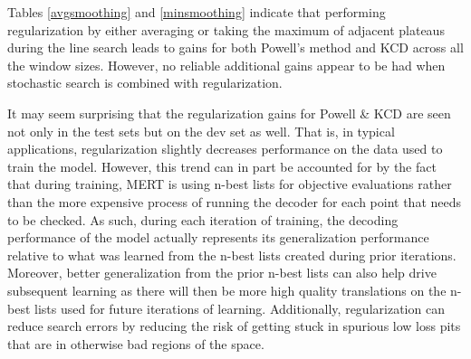 \documentclass[11pt]{article}
\begin{document}
Tables \ref{avgsmoothing} and \ref{minsmoothing} indicate that performing regularization by either averaging or taking the maximum of adjacent plateaus during the line search leads to gains for both Powell's method and KCD across all the window sizes. However, no reliable additional gains appear to be had when stochastic search is combined with regularization.

It may seem surprising that the regularization gains for Powell \& KCD are seen not only in the test sets but on the dev set as well. That is, in typical applications, regularization slightly decreases performance on the data used to train the model. However, this trend can in part be accounted for by the fact that during training, MERT is using n-best lists for objective evaluations rather than the more expensive process of running the decoder for each point that needs to be checked. As such, during each iteration of training, the decoding performance of the model actually represents its generalization performance relative to what was learned from the n-best lists created during prior iterations. Moreover, better generalization from the prior n-best lists can also help drive subsequent learning as there will then be more high quality translations on the n-best lists used for future iterations of learning. Additionally, regularization can reduce search errors by reducing the risk of getting stuck in spurious low loss pits that are in otherwise bad regions of the space.

\end{document}
